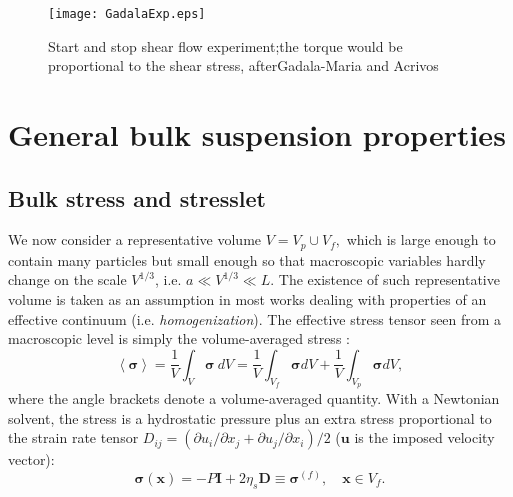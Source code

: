 \documentclass[english,fleqn,allpages]{ISTE_science}[2018/07/30]
\begin{document}
\begin{figure}[ptbh]
\centering
\texttt{[image: GadalaExp.eps]}\caption{Start and stop shear flow experiment;\break the torque would be proportional
to the shear stress, after\break Gadala-Maria and Acrivos \cite{Gadala80}}
\label{Fig 1}
\end{figure}\pagebreak





\section{General bulk suspension properties}


\subsection{Bulk stress and stresslet}

We now consider a representative volume $V=V_{p}\cup V_{f},$ which
is large enough to contain many particles but small enough so that
macroscopic variables hardly change on the scale $V^{1/3}$, i.e.
$a\ll V^{1/3}\ll L$. The existence of such representative volume
is taken as an assumption in most works dealing with properties of
an effective continuum (i.e. \textit{homogenization}). The effective
stress tensor seen from a macroscopic level is simply the volume-averaged
stress \cite{landau59}: 
\begin{equation}
\left\langle \mathbf{\sigma}\right\rangle =\frac{1}{V}\int_{V}\mathbf{\sigma}\ dV=\frac{1}{V}\int_{V_{f}}\mathbf{\sigma}dV+\frac{1}{V}\int_{V_{p}}\mathbf{\sigma}dV,
\end{equation}
where the angle brackets denote a volume-averaged quantity. With a
Newtonian solvent, the stress is a hydrostatic pressure plus an extra
stress proportional to the strain rate tensor $D_{ij}=\left(\partial u_{i}/\partial x_{j}+\partial u_{j}/\partial x_{i}\right)/2$
($\mathbf{u}$ is the imposed velocity vector):
\[
\mathbf{\sigma}(\mathbf{x})=-P\mathbf{I}+2\eta_{s}\mathbf{D}\equiv\mathbf{\sigma}^{(f)},\quad\mathbf{x}\in V_{f}.
\]
\end{document}
